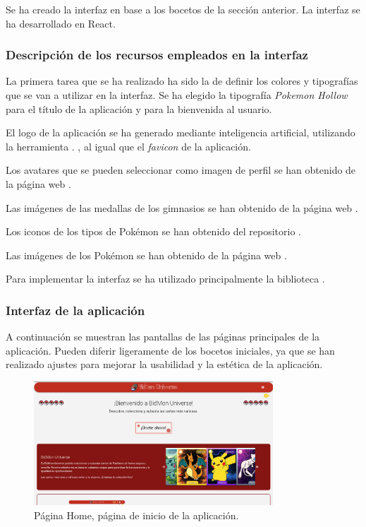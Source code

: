 Se ha creado la interfaz en base a los bocetos de la sección anterior.
La interfaz se ha desarrollado en React.

\subsubsection{Descripción de los recursos empleados en la interfaz}
La primera tarea que se ha realizado ha sido la de definir los colores y tipografías que se van a utilizar en la interfaz.
Se ha elegido la tipografía \textit{Pokemon Hollow} para el título de la aplicación y para la bienvenida al usuario.

El logo de la aplicación se ha generado mediante inteligencia artificial, utilizando la herramienta .
, al igual que el \textit{favicon} de la aplicación.

Los avatares que se pueden seleccionar como imagen de perfil se han obtenido de la página web .

Las imágenes de las medallas de los gimnasios se han obtenido de la página web .

Los iconos de los tipos de Pokémon se han obtenido del repositorio .

Las imágenes de los Pokémon se han obtenido de la página web .

Para implementar la interfaz se ha utilizado principalmente la biblioteca . 


\subsubsection{Interfaz de la aplicación}
A continuación se muestran las pantallas de las páginas principales de la aplicación.
Pueden diferir ligeramente de los bocetos iniciales, ya que se han realizado ajustes para mejorar la usabilidad y la estética de la aplicación.

\begin{figure}[H]
    \centering
    \includegraphics[width=0.8\textwidth]{figures/6-Analisis/6-Interfaz/interfaz/home.png}
    \caption{Página Home, página de inicio de la aplicación.}
    \label{fig:interfaz-home}
\end{figure}

